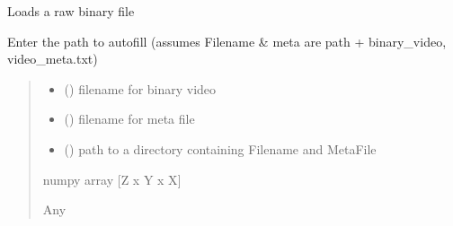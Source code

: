 \documentclass[letterpaper,10pt,english]{sphinxmanual}
\begin{document}

\begin{fulllineitems}
\label{\detokenize{IO:IO.load_raw_binary}}
\pysigstartsignatures
{}
\pysigstopsignatures
\sphinxAtStartPar
Loads a raw binary file

\sphinxAtStartPar
Enter the path to autofill (assumes Filename \& meta are path + binary\_video, video\_meta.txt)
\begin{quote}\begin{description}
\begin{itemize}
\item {} 
\sphinxAtStartPar
{} () \textendash{} filename for binary video

\item {} 
\sphinxAtStartPar
{} () \textendash{} filename for meta file

\item {} 
\sphinxAtStartPar
{} () \textendash{} path to a directory containing Filename and MetaFile

\end{itemize}

\sphinxAtStartPar
numpy array {[}Z x Y x X{]}

\sphinxAtStartPar
Any

\end{description}\end{quote}

\end{fulllineitems}

\end{document}
